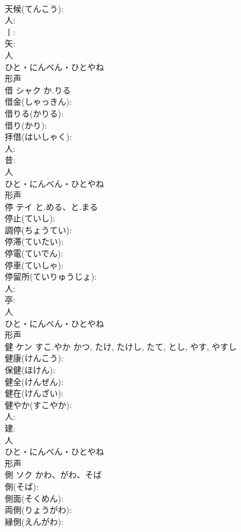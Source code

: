 \documentclass[8pt]{extreport}
\begin{document}
\begin{CJK}{UTF8}{min}
\\	天候(てんこう): 
\\	人: 
\\	丨: 
\\	矢: 
\\	人	
\\	ひと・にんべん・ひとやね	
\\	形声 
\\	借	シャク	か.りる		
\\	借金(しゃっきん): 
\\	借りる(かりる): 
\\	借り(かり): 
\\	拝借(はいしゃく): 
\\	人: 
\\	昔: 
\\	人	
\\	ひと・にんべん・ひとやね	
\\	形声 
\\	停	テイ	と.める、と.まる		
\\	停止(ていし): 
\\	調停(ちょうてい): 
\\	停滞(ていたい): 
\\	停電(ていでん): 
\\	停車(ていしゃ): 
\\	停留所(ていりゅうじょ): 
\\	人: 
\\	亭: 
\\	人	
\\	ひと・にんべん・ひとやね	
\\	形声 
\\	健	ケン	すこ.やか	かつ, たけ, たけし, たて, とし, やす, やすし	
\\	健康(けんこう): 
\\	保健(ほけん): 
\\	健全(けんぜん): 
\\	健在(けんざい): 
\\	健やか(すこやか): 
\\	人: 
\\	建: 
\\	人	
\\	ひと・にんべん・ひとやね	
\\	形声 
\\	側	ソク	かわ、がわ、そば		
\\	側(そば): 
\\	側面(そくめん): 
\\	両側(りょうがわ): 
\\	縁側(えんがわ): 

\end{CJK}
\end{document}
